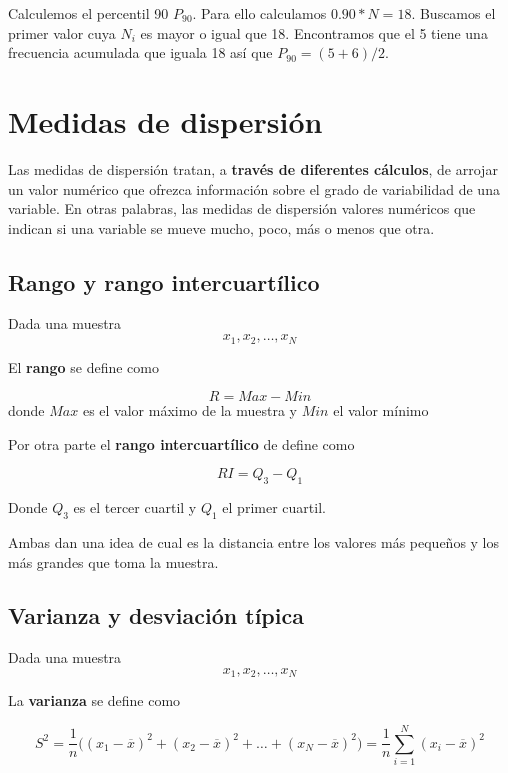 \documentclass[
]{article}
\begin{document}
Calculemos el percentil 90 \(P_{90}\). Para ello calculamos
\(0.90*N = 18\). Buscamos el primer valor cuya \(N_i\) es mayor o igual
que 18. Encontramos que el 5 tiene una frecuencia acumulada que iguala
18 así que \(P_{90} = (5+6)/2\).

\hypertarget{medidas-de-dispersiuxf3n}{%
\section{Medidas de dispersión}\label{medidas-de-dispersiuxf3n}}

Las medidas de dispersión tratan, a \textbf{través de diferentes
cálculos}, de arrojar un valor numérico que ofrezca información sobre el
grado de variabilidad de una variable. En otras palabras, las medidas de
dispersión valores numéricos que indican si una variable se mueve mucho,
poco, más o menos que otra.

\hypertarget{rango-y-rango-intercuartuxedlico}{%
\subsection{Rango y rango
intercuartílico}\label{rango-y-rango-intercuartuxedlico}}

Dada una muestra \[ x_1, x_2, \ldots , x_N\]

El \textbf{rango} se define como

\[R= Max - Min\] donde \(Max\) es el valor máximo de la muestra y
\(Min\) el valor mínimo

Por otra parte el \textbf{rango intercuartílico} de define como

\[RI =  Q_3 - Q_1\]

Donde \(Q_3\) es el tercer cuartil y \(Q_1\) el primer cuartil.

Ambas dan una idea de cual es la distancia entre los valores más
pequeños y los más grandes que toma la muestra.

\hypertarget{varianza-y-desviaciuxf3n-tuxedpica}{%
\subsection{Varianza y desviación
típica}\label{varianza-y-desviaciuxf3n-tuxedpica}}

Dada una muestra \[ x_1, x_2, \ldots , x_N\]

La \textbf{varianza} se define como

\[S^2 = \frac{1}{n}\big( (x_1 - \overline x)^2 + (x_2 - \overline x)^2 + \ldots + (x_N - \overline x)^2 \big)= \frac{1}{n}\sum^N_{i=1} (x_i - \overline x)^2\]
\end{document}
